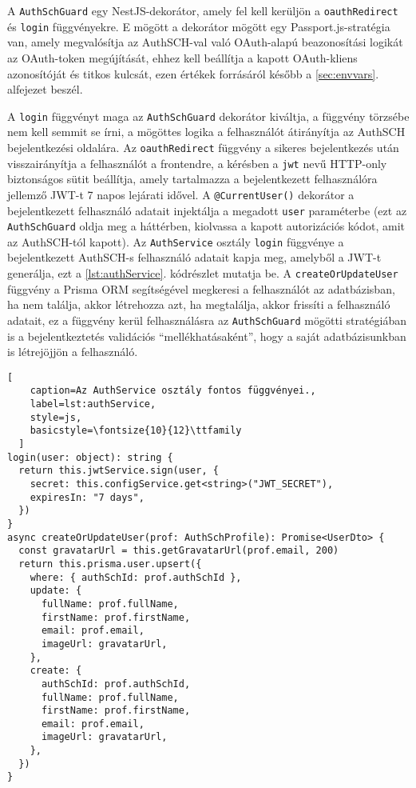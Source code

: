 A \verb|AuthSchGuard| egy NestJS-dekorátor, amely fel kell kerüljön a \verb|oauthRedirect| és \verb|login| függvényekre. E mögött a dekorátor mögött egy Passport.js-stratégia\cite{passport} van, amely megvalósítja az AuthSCH-val való OAuth-alapú beazonosítási logikát az OAuth-token megújítását, ehhez kell beállítja a kapott OAuth-kliens azonosítóját és titkos kulcsát, ezen értékek forrásáról később a \ref{sec:envvars}. alfejezet beszél.

A \verb|login| függvényt maga az \verb|AuthSchGuard| dekorátor kiváltja, a függvény törzsébe nem kell semmit se írni, a mögöttes logika a felhasználót átirányítja az AuthSCH bejelentkezési oldalára. Az \verb|oauthRedirect| függvény a sikeres bejelentkezés után visszairányítja a felhasználót a frontendre, a kérésben a \verb|jwt| nevű HTTP-only biztonságos sütit beállítja\cite{ietf-oauth-security-topics-13}, amely tartalmazza a bejelentkezett felhasználóra jellemző JWT-t 7 napos lejárati idővel. A \verb|@CurrentUser()| dekorátor a bejelentkezett felhasználó adatait injektálja a megadott \verb|user| paraméterbe (ezt az \verb|AuthSchGuard| oldja meg a háttérben, kiolvassa a kapott autorizációs kódot, amit az AuthSCH-tól kapott). Az \verb|AuthService| osztály \verb|login| függvénye a bejelentkezett AuthSCH-s felhasználó adatait kapja meg, amelyből a JWT-t generálja, ezt a \ref{lst:authService}. kódrészlet mutatja be. A \verb|createOrUpdateUser| függvény a Prisma ORM segítségével megkeresi a felhasználót az adatbázisban, ha nem találja, akkor létrehozza azt, ha megtalálja, akkor frissíti a felhasználó adatait, ez a függvény kerül felhasználásra az \verb|AuthSchGuard| mögötti stratégiában is a bejelentkeztetés validációs ``mellékhatásaként'', hogy a saját adatbázisunkban is létrejöjjön a felhasználó.

\begin{minipage}{0.92\textwidth}
  \begin{lstlisting}[
    caption=Az AuthService osztály fontos függvényei.,
    label=lst:authService,
    style=js,
    basicstyle=\fontsize{10}{12}\ttfamily
  ]
login(user: object): string {
  return this.jwtService.sign(user, {
    secret: this.configService.get<string>("JWT_SECRET"),
    expiresIn: "7 days",
  })
}
async createOrUpdateUser(prof: AuthSchProfile): Promise<UserDto> {
  const gravatarUrl = this.getGravatarUrl(prof.email, 200)
  return this.prisma.user.upsert({
    where: { authSchId: prof.authSchId },
    update: {
      fullName: prof.fullName,
      firstName: prof.firstName,
      email: prof.email,
      imageUrl: gravatarUrl,
    },
    create: {
      authSchId: prof.authSchId,
      fullName: prof.fullName,
      firstName: prof.firstName,
      email: prof.email,
      imageUrl: gravatarUrl,
    },
  })
}
\end{lstlisting}
\end{minipage}

